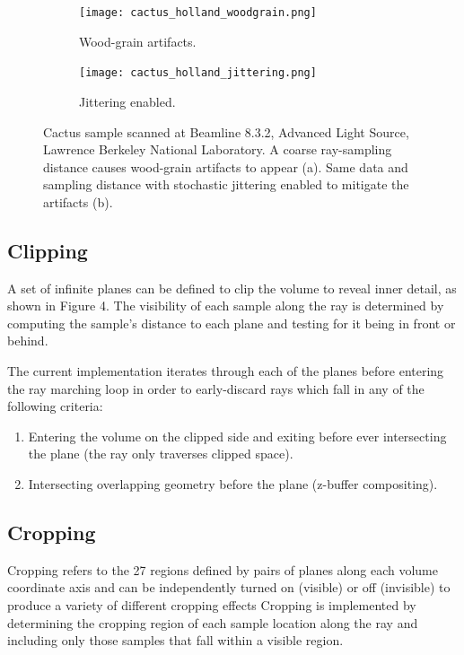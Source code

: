 \begin{figure}[htb]
\centering
  \begin{subfigure}[b]{.5\columnwidth}
    \centering
    \texttt{[image: cactus\_holland\_woodgrain.png]}
    \caption{Wood-grain artifacts.}
    \label{fig:jittering_without}
  \end{subfigure}%
  \begin{subfigure}[b]{.5\columnwidth}
    \centering
    \texttt{[image: cactus\_holland\_jittering.png]}
    \caption{Jittering enabled.}
    \label{fig:jittering_with}
  \end{subfigure}
  \caption{Cactus sample scanned at Beamline 8.3.2, Advanced Light Source,
  Lawrence Berkeley National Laboratory. A coarse ray-sampling distance causes
  wood-grain artifacts to appear (a). Same data and sampling distance with
  stochastic jittering enabled to mitigate the artifacts (b).}
  \label{fig:jittering}
\end{figure}

\subsection{Clipping}
\label{clipping}
A set of infinite planes can be defined to clip the volume to reveal inner
detail, as shown in Figure 4.  The visibility of each sample along the ray
is determined by computing the sample's distance to each plane and testing
for it being in front or behind.

The current implementation iterates through each of the planes before entering
the ray marching loop in order to early-discard rays which fall in any of the
following criteria:

\begin{enumerate}
\item Entering the volume on the clipped side and exiting before ever
  intersecting the plane (the ray only traverses clipped space).
\item Intersecting overlapping geometry before the plane (z-buffer compositing).
\end{enumerate}

\subsection{Cropping} Cropping refers to the 27 regions defined by pairs of
planes along each volume coordinate axis and can be independently turned
on (visible) or off (invisible) to produce a variety of different cropping
effects%
Cropping is implemented by determining the cropping region of each sample
location along the ray and including only those samples that fall within
a visible region.

